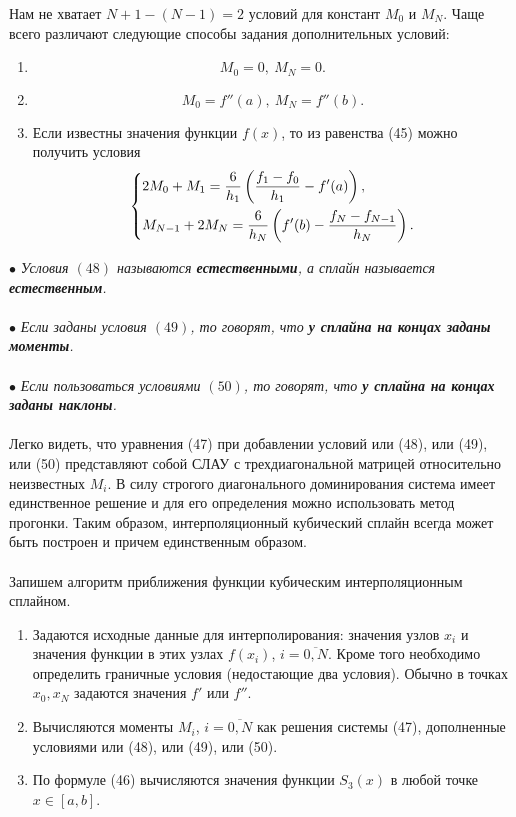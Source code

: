 \documentclass[a4paper, 12pt]{report}
\numberwithin{equation}{section}
\begin{document}
	 Нам не хватает $N+1 - (N-1) = 2$ условий для констант $M_0$ и $M_{N}$. Чаще всего различают следующие способы задания дополнительных условий:
	 \begin{enumerate}
	 	\item 
	 	\begin{equation}
	 		M_0 =0,\ M_N = 0.
	 	\end{equation}
	 	\item 
	 	\begin{equation}
	 		M_0 = f''(a),\ M_N = f''(b).
	 	\end{equation}
	 	\item Если известны значения функции $f(x)$, то из равенства (45) можно получить условия 
	 	\begin{equation}
	 		\begin{dcases}
		 	2M_0 + M_1 = \dfrac{6}{h_1}\left(\dfrac{f_1-f_0}{h_1} - f'(a)\right),\\
		 	M_{N-1} + 2M_N = \dfrac{6}{h_N}\left(f'(b) - \dfrac{f_N-f_{N-1}}{h_N} \right).
		 	\end{dcases}
	 	\end{equation}
	 \end{enumerate}
	 $\bullet$ \textit{Условия $(48)$ называются \textbf{естественными}, а сплайн называется \textbf{естественным}.}\\\\
	 $\bullet$ \textit{Если заданы условия $(49)$, то говорят, что \textbf{у сплайна на концах заданы моменты}.}\\\\
	 $\bullet$ \textit{Если пользоваться условиями $(50)$, то говорят, что \textbf{у сплайна на концах заданы наклоны}.}\\\\
	 Легко видеть, что уравнения (47) при добавлении условий или (48), или (49), или (50) представляют собой СЛАУ с трехдиагональной матрицей относительно неизвестных $M_i$. В силу строгого диагонального доминирования система имеет единственное решение и для его определения можно использовать метод прогонки. Таким образом, интерполяционный кубический сплайн всегда может быть построен и причем единственным образом.\\\\
	 Запишем алгоритм приближения функции кубическим интерполяционным сплайном. \begin{enumerate}
	 	\item Задаются исходные данные для интерполирования: значения узлов $x_i$ и значения функции в этих узлах $f(x_i)$, $i=\overline{0,N}$. Кроме того необходимо определить граничные условия (недостающие два условия). Обычно в точках $x_0, x_N$ задаются значения $f'$ или $f''$.
	 	\item Вычисляются моменты $M_i$, $i=\overline{0,N}$ как решения системы (47), дополненные условиями или (48), или (49), или (50).
	 	\item По формуле (46) вычисляются значения функции $S_3(x)$ в любой точке $x \in [a,b]$.
	 \end{enumerate}
\end{document}
